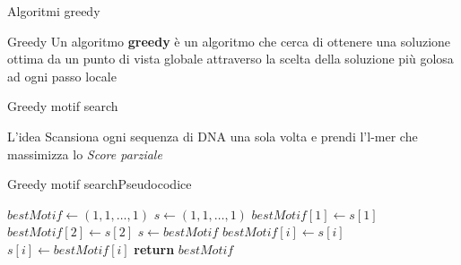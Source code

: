 	\begin{frame}{Algoritmi greedy}
		\begin{block}{Greedy}
			Un algoritmo \alert{\textbf{greedy}} è un algoritmo che cerca di ottenere una soluzione ottima da un punto di vista globale attraverso la scelta della soluzione più golosa ad ogni passo locale
		\end{block}
	\end{frame}
	
	\begin{frame}{Greedy motif search}
		\begin{block}{L'idea}
			Scansiona ogni sequenza di DNA una sola volta e prendi l'l-mer che massimizza lo \textit{Score parziale}
		\end{block}
	\end{frame}
	
	\begin{frame}{Greedy motif search}{Pseudocodice}
		\begin{center}\scriptsize
			\begin{minipage}{8.6cm}
			    \begin{algorithmic}[1]
				    	\State $bestMotif\gets (1,1,\dots,1)$
					    \State $s\gets (1,1,\dots,1)$
					    			\State $bestMotif[1]\gets s[1]$
					    			\State $bestMotif[2]\gets s[2]$
					    		\EndIf
					    	\EndFor
					    \EndFor
					    \State $s\gets bestMotif$
					    			\State $bestMotif[i]\gets s[i]$
					    		\EndIf
					    	\EndFor
					    	\State $s[i]\gets bestMotif[i]$
					    \EndFor
					    \State \textbf{return} $bestMotif$
				    \EndProcedure
			    \end{algorithmic}
			\end{minipage}
	    \end{center}
	\end{frame}
	
